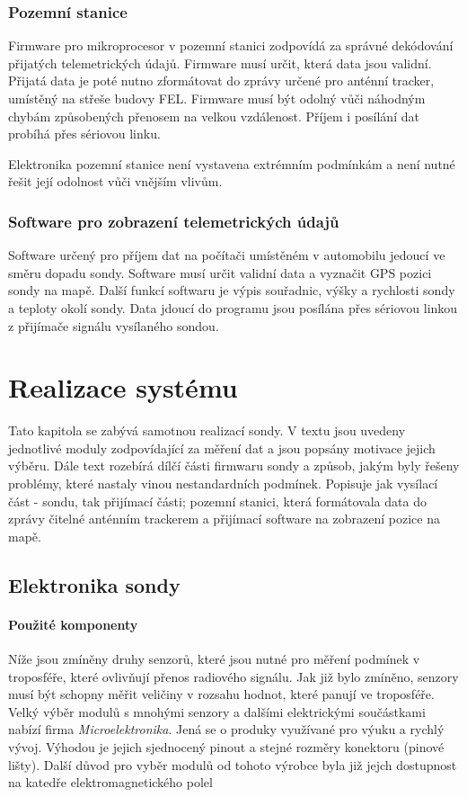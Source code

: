 \documentclass[twoside]{ctuthesis}
\theoremstyle{plain}
\theoremstyle{definition}
\theoremstyle{note}
\begin{document}
		\subsection{Pozemní stanice}
		\label{sec:navrh:pozemni_stanice}
		Firmware pro mikroprocesor v pozemní stanici zodpovídá za správné dekódování přijatých telemetrických údajů. Firmware musí určit, která data jsou validní. Přijatá data je poté nutno zformátovat do zprávy určené pro anténní tracker, umístěný na střeše budovy FEL. Firmware musí být odolný vůči náhodným chybám způsobených přenosem na velkou vzdálenost. Příjem i posílání dat probíhá přes sériovou linku. 

		Elektronika pozemní stanice není vystavena extrémním podmínkám a není nutné řešit její odolnost vůči vnějším vlivům. 


		\subsection{Software pro zobrazení telemetrických údajů}
		Software určený pro příjem dat na počítači umístěném v automobilu jedoucí ve směru dopadu sondy. Software musí určit validní data a vyznačit GPS pozici sondy na mapě. Další funkcí softwaru je výpis souřadnic, výšky a rychlosti sondy a teploty okolí sondy. Data jdoucí do programu jsou posílána přes sériovou linkou z přijímače signálu vysílaného sondou. 




\chapter{Realizace systému}
Tato kapitola se zabývá samotnou realizací sondy. V textu jsou uvedeny jednotlivé moduly zodpovídající za měření dat a jsou popsány motivace jejich výběru. Dále text rozebírá dílčí části firmwaru sondy a způsob, jakým byly řešeny problémy, které nastaly vinou nestandardních podmínek. Popisuje jak vysílací část - sondu, tak přijímací části; pozemní stanici, která formátovala data do zprávy čitelné anténním trackerem a přijímací software na zobrazení pozice na mapě. 

	\section{Elektronika sondy}
		\subsubsection{Použité komponenty}
		Níže jsou zmíněny druhy senzorů, které jsou nutné pro měření podmínek v troposféře, které ovlivňují přenos radiového signálu. Jak již bylo zmíněno, senzory musí být schopny měřit veličiny v rozsahu hodnot, které panují ve troposféře. Velký výběr modulů s mnohými senzory a dalšími elektrickými součástkami nabízí firma \textit{Microelektronika}. Jená se o produky využívané pro výuku a rychlý vývoj. Výhodou je jejich sjednocený pinout a stejné rozměry konektoru (pinové lišty). Další důvod pro vyběr modulů od tohoto výrobce byla již jejch dostupnost na katedře elektromagnetického polel
\end{document}
